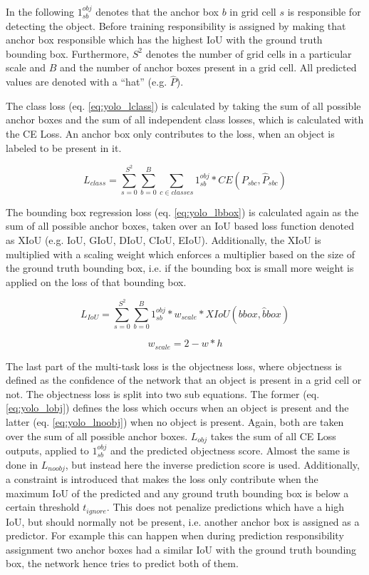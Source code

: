 In the following $1_{sb}^{obj}$ denotes that the anchor box $b$ in grid cell $s$ is responsible for detecting the object.
Before training responsibility is assigned by making that anchor box responsible which has the highest \ac{IoU} with the ground truth bounding box.
Furthermore, $S^2$ denotes the number of grid cells in a particular scale and $B$ and the number of anchor boxes present in a grid cell.
All predicted values are denoted with a ``hat'' (e.g. $\hat{P}$).

The class loss (eq. \ref{eq:yolo_lclass}) is calculated by taking the sum of all possible anchor boxes and the sum of all independent class losses, which is calculated with the \ac{CE} Loss.
An anchor box only contributes to the loss, when an object is labeled to be present in it.

\begin{equation}
    L_{class} = \sum_{s=0}^{S^2} \sum_{b=0}^B \sum_{c \in classes} 1_{sb}^{obj} * CE(P_{sbc}, \hat{P}_{sbc})
    \label{eq:yolo_lclass}
\end{equation}

The bounding box regression loss (eq. \ref{eq:yolo_lbbox}) is calculated again as the sum of all possible anchor boxes, taken over an \ac{IoU} based loss function denoted as XIoU (e.g. \ac{IoU}, \ac{GIoU}, \ac{DIoU}, \ac{CIoU}, \ac{EIoU}).
Additionally, the XIoU is multiplied with a scaling weight which enforces a multiplier based on the size of the ground truth bounding box, i.e. if the bounding box is small more weight is applied on the loss of that bounding box.

\begin{equation}
    L_{IoU} = \sum_{s=0}^{S^2}\sum_{b=0}^{B} 1^{obj}_{sb} * w_{scale} * XIoU(bbox, \hat{b}box)
    \label{eq:yolo_lbbox}
\end{equation}

\begin{equation}
    w_{scale} = 2 - w * h
\end{equation}

The last part of the multi-task loss is the objectness loss, where objectness is defined as the confidence of the network that an object is present in a grid cell or not.
The objectness loss is split into two sub equations.
The former (eq. \ref{eq:yolo_lobj}) defines the loss which occurs when an object is present and the latter (eq. \ref{eq:yolo_lnoobj}) when no object is present.
Again, both are taken over the sum of all possible anchor boxes.
$L_{obj}$ takes the sum of all \ac{CE} Loss outputs, applied to $1_{sb}^{obj}$ and the predicted objectness score.
Almost the same is done in $L_{noobj}$, but instead here the inverse prediction score is used.
Additionally, a constraint is introduced that makes the loss only contribute when the maximum \ac{IoU} of the predicted and any ground truth bounding box is below a certain threshold $t_{ignore}$.
This does not penalize predictions which have a high \ac{IoU}, but should normally not be present, i.e. another anchor box is assigned as a predictor.
For example this can happen when during prediction responsibility assignment two anchor boxes had a similar \ac{IoU} with the ground truth bounding box, the network hence tries to predict both of them.

